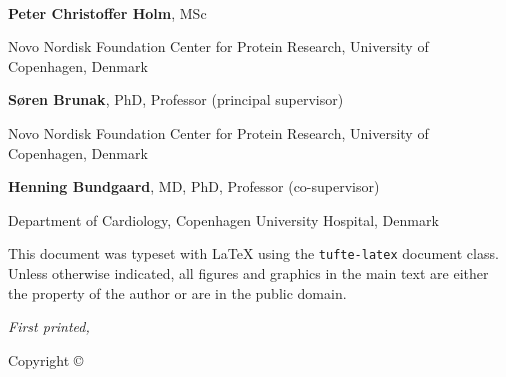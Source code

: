 \begin{@empty}
~\vfill
\thispagestyle{empty}
\setlength{\parindent}{0pt}
\setlength{\parskip}{\baselineskip}


\textbf{Peter Christoffer Holm}, MSc

Novo Nordisk Foundation Center for Protein Research,
University of Copenhagen, Denmark


\textbf{Søren Brunak}, PhD, Professor 
(principal supervisor)

Novo Nordisk Foundation Center for Protein Research, 
University of Copenhagen, Denmark

\textbf{Henning Bundgaard}, MD, PhD, Professor 
(co-supervisor)

Department of Cardiology,
Copenhagen University Hospital, Denmark

\vspace{2em}

\par{}

\vspace{5em}

\par This document was typeset with \LaTeX{}
using the \texttt{tufte-latex} document class.
Unless otherwise indicated, all figures and graphics in the main text
are either the property of the author or are in the public domain.

\par\textit{First printed, \monthyear}

Copyright \copyright\ \the\year\ \thanklessauthor
\end{@empty}
